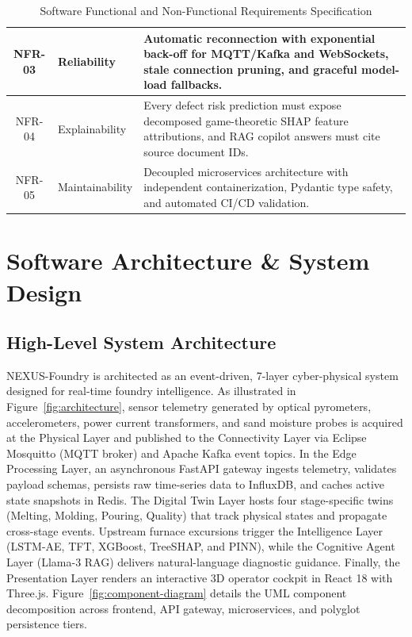 \documentclass[11pt, a4paper]{article}
\begin{document}
\begin{table}[H]
\begin{tabular}{|c|p{3.0cm}|p{9.2cm}|}
        \hline
        NFR-03 & Reliability & Automatic reconnection with exponential back-off for MQTT/Kafka and WebSockets, stale connection pruning, and graceful model-load fallbacks. \\
        \hline
        NFR-04 & Explainability & Every defect risk prediction must expose decomposed game-theoretic SHAP feature attributions, and RAG copilot answers must cite source document IDs. \\
        \hline
        NFR-05 & Maintainability & Decoupled microservices architecture with independent containerization, Pydantic type safety, and automated CI/CD validation. \\
        \hline
    \end{tabular}
    \caption{Software Functional and Non-Functional Requirements Specification}
    \label{tab:srs-requirements}
\end{table}

\section{Software Architecture \& System Design}

\subsection{High-Level System Architecture}
\noindent
NEXUS-Foundry is architected as an event-driven, 7-layer cyber-physical system designed for real-time foundry intelligence. As illustrated in Figure~\ref{fig:architecture}, sensor telemetry generated by optical pyrometers, accelerometers, power current transformers, and sand moisture probes is acquired at the Physical Layer and published to the Connectivity Layer via Eclipse Mosquitto (MQTT broker) and Apache Kafka event topics. In the Edge Processing Layer, an asynchronous FastAPI gateway ingests telemetry, validates payload schemas, persists raw time-series data to InfluxDB, and caches active state snapshots in Redis. The Digital Twin Layer hosts four stage-specific twins (Melting, Molding, Pouring, Quality) that track physical states and propagate cross-stage events. Upstream furnace excursions trigger the Intelligence Layer (LSTM-AE, TFT, XGBoost, TreeSHAP, and PINN), while the Cognitive Agent Layer (Llama-3 RAG) delivers natural-language diagnostic guidance. Finally, the Presentation Layer renders an interactive 3D operator cockpit in React 18 with Three.js. Figure~\ref{fig:component-diagram} details the UML component decomposition across frontend, API gateway, microservices, and polyglot persistence tiers.
\end{document}
